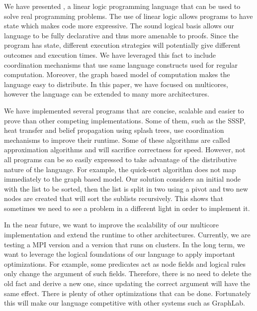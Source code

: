 
We have presented \lang, a linear logic programming language that can be used to solve real programming problems.
The use of linear logic allows programs to have state which makes code more expressive.
The sound logical basis allows our language to be fully declarative and thus more amenable to proofs.
Since the program has state, different execution strategies will potentially give different outcomes and execution times. We have
leveraged this fact to include coordination mechanisms that use same language constructs used for regular computation.
Moreover, the graph based model of computation makes the language easy to distribute. In this paper, we have
focused on multicores, however the language can be extended to many more architectures.

We have implemented several programs that are concise, scalable and easier to prove than other competing implementations. Some of them, such as
the SSSP, heat transfer and belief propagation using splash trees, use coordination mechanisms to improve their runtime. Some of these algorithms
are called approximation algorithms and will sacrifice correctness for speed. However, not all programs can be so easily expressed
to take advantage of the distributive nature of the language. For example, the quick-sort
algorithm does not map immediately to the graph based model. Our solution considers an initial node with the list to be
sorted, then the list is split in two using a pivot and two new nodes are created that will sort the sublists recursively. This shows that
sometimes we need to see a problem in a different light in order to implement it.

In the near future, we want to improve the scalability of our multicore implementation and extend the runtime to other architectures. Currently,
we are testing a MPI version and a version that runs on clusters. In the long term, we want to leverage the logical foundations of our language
to apply important optimizations. For example, some predicates act as node fields and logical rules only change the argument of such fields.
Therefore, there is no need to delete the old fact and derive a new one, since updating the correct argument will have the same effect.
There is plenty of other optimizations that can be done. Fortunately this will make our language competitive with other systems such as GraphLab.